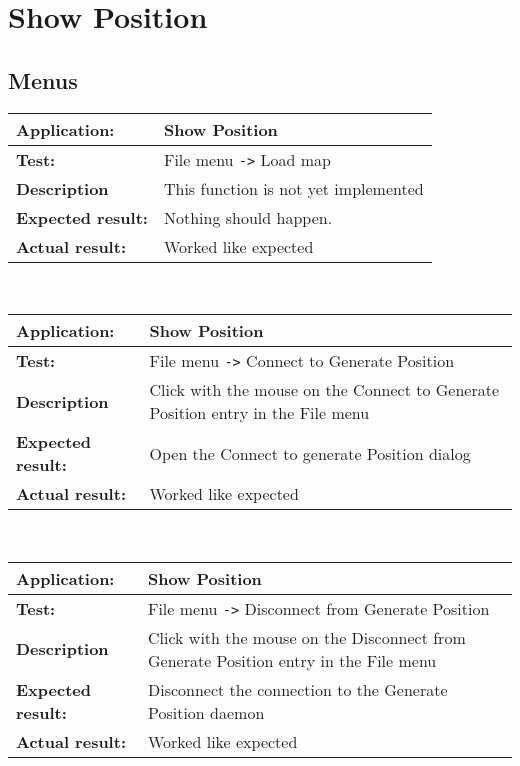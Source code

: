  \section{Show Position}
  \subsection{Menus}
   \begin{tabular}{|p{3.5cm}|p{10.5cm}|}
    \hline
     \textbf{Application:}	& Show Position\\
    \hline
     \textbf{Test:}		& File menu \verb=->= Load map\\
    \hline
     \textbf{Description}	& This function is not yet implemented\\
    \hline
     \textbf{Expected result:}	& Nothing should happen.\\
    \hline
     \textbf{Actual result:}	& Worked like expected\\
    \hline
   \end{tabular}\\
   \begin{tabular}{|p{3.5cm}|p{10.5cm}|}
    \hline
     \textbf{Application:}	& Show Position\\
    \hline
     \textbf{Test:}		& File menu \verb=->= Connect to Generate Position\\
    \hline
     \textbf{Description}	& Click with the mouse on the Connect to Generate Position entry in the File menu\\
    \hline
     \textbf{Expected result:}	& Open the Connect to generate Position dialog\\
    \hline
     \textbf{Actual result:}	& Worked like expected\\
    \hline
   \end{tabular}\\
   \begin{tabular}{|p{3.5cm}|p{10.5cm}|}
    \hline
     \textbf{Application:}	& Show Position\\
    \hline
     \textbf{Test:}		& File menu \verb=->= Disconnect from Generate Position\\
    \hline
     \textbf{Description}	& Click with the mouse on the Disconnect from Generate Position entry in the File menu\\
    \hline
     \textbf{Expected result:}	& Disconnect the connection to the Generate Position daemon\\
    \hline
     \textbf{Actual result:}	& Worked like expected\\
    \hline
   \end{tabular}\\
